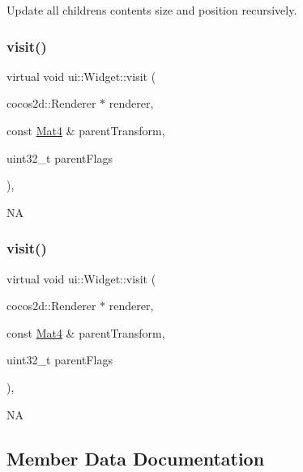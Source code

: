 Update all children\textquotesingle{}s contents size and position recursively. \mbox{\label{classui_1_1Widget_a83e4156c39e276986f277e6f7659c319}} 
\subsubsection{\texorpdfstring{visit()}{visit()}\hspace{0.1cm}{\footnotesize\ttfamily [1/2]}}
{\footnotesize\ttfamily virtual void ui\+::\+Widget\+::visit (\begin{DoxyParamCaption}\item[{cocos2d\+::\+Renderer $\ast$}]{renderer,  }\item[{const \hyperlink{classMat4}{Mat4} \&}]{parent\+Transform,  }\item[{uint32\+\_\+t}]{parent\+Flags }\end{DoxyParamCaption})\hspace{0.3cm}{\ttfamily [override]}, {\ttfamily [virtual]}}

NA \mbox{\label{classui_1_1Widget_a83e4156c39e276986f277e6f7659c319}} 
\subsubsection{\texorpdfstring{visit()}{visit()}\hspace{0.1cm}{\footnotesize\ttfamily [2/2]}}
{\footnotesize\ttfamily virtual void ui\+::\+Widget\+::visit (\begin{DoxyParamCaption}\item[{cocos2d\+::\+Renderer $\ast$}]{renderer,  }\item[{const \hyperlink{classMat4}{Mat4} \&}]{parent\+Transform,  }\item[{uint32\+\_\+t}]{parent\+Flags }\end{DoxyParamCaption})\hspace{0.3cm}{\ttfamily [override]}, {\ttfamily [virtual]}}

NA 

\subsection{Member Data Documentation}
\mbox{\label{classui_1_1Widget_a739f4bacda986ae760ef6f68678ca617}} 
